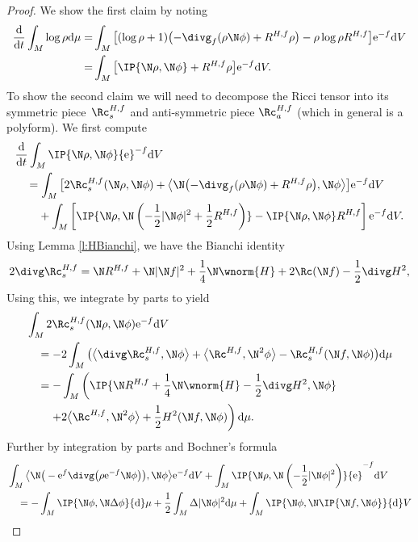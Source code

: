 \begin{proof}
	We show the first claim by noting
	\begin{align*}
	\frac{{\rm d}}{{\rm d}t} \int_M \log\rho {\rm d}\mu
	=&\int_M \big[ (\log\rho+1)\bigl(-\divg_f(\rho \N\phi)+R^{H,f}\rho\bigr)-\rho\log\rho R^{H,f} \big] {\rm e}^{-f} {\rm d}V\\
	=&\int_M \big[ \IP{\N\rho,\N\phi}+R^{H,f}\rho \big]{\rm e}^{-f} {\rm d}V.
	\end{align*}
	To show the second claim we will need to decompose the Ricci tensor into its symmetric piece~$\Rc^{H,f}_s$ and anti-symmetric piece $\Rc^{H,f}_a$ (which in general is a polyform). We first compute
	\begin{align*}
	&\frac{{\rm d}}{{\rm d}t} \int_M \IP{\N\rho,\N\phi}{\rm e}^{-f} {\rm d}V\\
&\quad=\int_M \big[ 2\Rc^{H,f}_s(\N\rho,\N\phi) + \big\langle\N\bigl(- \divg_f (\rho \N \phi) +R^{H,f}\rho\bigr),\N \phi\big\rangle \big] {\rm e}^{-f} {\rm d}V \\
	&\quad\phantom{={}}{}+\int_M \left[ \IP{\N\rho,\N \left(-\frac12|\N\phi|^2+\frac12R^{H,f} \right)} - \IP{\N\rho,\N\phi} R^{H,f} \right] {\rm e}^{-f} {\rm d}V.
	\end{align*}
 Using Lemma \ref{l:HBianchi}, we have the Bianchi identity
 \begin{align*}
 	 2\divg \Rc^{H,f}_s=\N R^{H,f}+\N|\N f|^2+\frac1{4}\N\wnorm{H}+2\Rc(\N f)-\frac12\divg H^2,
	\end{align*}
 Using this, we integrate by parts to yield
 \begin{align*}
	&\int_M 2 \Rc^{H,f}_s (\N\rho,\N\phi){\rm e}^{-f} {\rm d}V\\
 &\quad=-2\int_M \big(\big\langle\divg \Rc^{H,f}_s,\N\phi\big\rangle+\big\langle\Rc^{H,f},\N^2\phi\big\rangle- \Rc^{H,f}_s(\N f,\N\phi) \big) {\rm d}\mu\\
	&\quad=-\int_M \left(\IP{\N R^{H,f}+\frac1{4}\N\wnorm{H}-\frac12\divg H^2,\N\phi}\right.\\
&\phantom{\quad={}}{}\left.+2\big\langle\Rc^{H,f},\N^2\phi\big\rangle+\frac12 H^2(\N f,\N\phi) \right) {\rm d}\mu.
\end{align*}
 Further by integration by parts and Bochner's formula
 \begin{align*}
	&\int_M \big\langle\N\big(-{\rm e}^{f}\divg\big(\rho {\rm e}^{-f}\N\phi\big)\big),\N \phi\big\rangle{\rm e}^{-f} {\rm d}V +\int_M \IP{\N\rho,\N\left(-\frac12|\N\phi|^2\right)}{\rm e}^{-f} {\rm d}V\\
	&\quad=-\int_M \IP{\N\phi,\N\Delta\phi} {\rm d}\mu+\frac12\int_M \Delta|\N\phi|^2 {\rm d}\mu +\int_M \IP{\N \phi,\N\IP{\N f,\N\phi}} {\rm d}V\\

\end{align*}
\end{proof}
